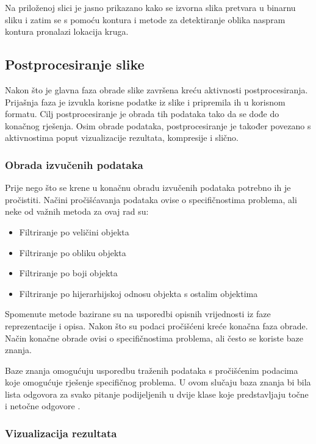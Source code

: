 \documentclass{foi}
\begin{document}
Na priloženoj slici je jasno prikazano kako se izvorna slika pretvara u binarnu sliku i zatim se s pomoću kontura i metode za detektiranje oblika naspram kontura pronalazi lokacija kruga.

\subsection{Postprocesiranje slike}

Nakon što je glavna faza obrade slike završena kreću aktivnosti postprocesiranja. Prijašnja faza je izvukla korisne podatke iz slike i pripremila ih u korisnom formatu. Cilj postprocesiranje je obrada tih podataka tako da se dođe do konačnog rješenja. Osim obrade podataka, postprocesiranje je također povezano s aktivnostima poput vizualizacije rezultata, kompresije i slično.

\subsubsection{Obrada izvučenih podataka}

\begin{flushleft}
    Prije nego što se krene u konačnu obradu izvučenih podataka potrebno ih je pročistiti. Načini pročišćavanja podataka ovise o specifičnostima problema, ali neke od važnih metoda za ovaj rad su:
\begin{itemize}
    \item Filtriranje po veličini objekta
    \item Filtriranje po obliku objekta
    \item Filtriranje po boji objekta
    \item Filtriranje po hijerarhijskoj odnosu objekta s ostalim objektima
\end{itemize}
\end{flushleft}

Spomenute metode bazirane su na usporedbi opisnih vrijednosti iz faze reprezentacije i opisa. Nakon što su podaci pročišćeni kreće konačna faza obrade. Način konačne obrade ovisi o specifičnostima problema, ali često se koriste baze znanja.

Baze znanja omogućuju usporedbu traženih podataka s pročišćenim podacima koje omogućuje rješenje specifičnog problema. U ovom slučaju baza znanja bi bila lista odgovora za svako pitanje podijeljenih u dvije klase koje predstavljaju točne i netočne odgovore \cite{ImageProcessing}. 

\subsubsection{Vizualizacija rezultata}
\end{document}
